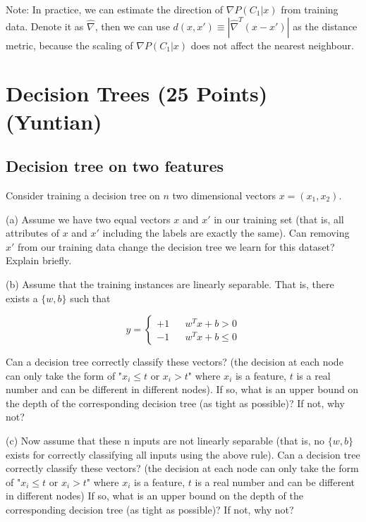 Note: In practice, we can estimate the direction of $\nabla P(C_1 |x)$ from training data. Denote it as $\hat{\nabla}$, then we can use $d(x, x') \equiv |\hat{\nabla}^T (x - x')|$ as the distance metric, because the scaling of $\nabla P(C_1 |x)$ does not affect the nearest neighbour.

\section{Decision Trees (25 Points) (Yuntian)}
\subsection{Decision tree on two features}
Consider training a decision tree on $n$ two dimensional vectors $x = (x_1,x_2)$.

(a) Assume we have two equal vectors $x$ and $x'$ in our training set (that is, all attributes of $x$ and $x'$ including the labels are exactly the same). Can removing $x'$ from our training data change the decision tree we learn for this dataset? Explain briefly.

(b) Assume that the training instances are linearly separable. That is, there exists a $\{w, b\}$ such that

$$
y=\left\{
\begin{array}{rcl}
+1       &      & {w^T x + b > 0}\\
-1     &      & {w^T x + b \le 0}
\end{array} \right.
$$

Can a decision tree correctly classify these vectors? ({\color{red}the decision at each node can only take the form of "$x_i \le t$ or $x_i > t$" where $x_i$ is a feature, $t$ is a real number and can be different in different nodes}). If so, what is an upper bound on the depth of the corresponding decision tree (as tight as possible)? If not, why not?

(c) Now assume that these n inputs are not linearly separable (that is, no $\{w, b\}$ exists for correctly classifying all inputs using the above rule). Can a decision tree correctly classify these vectors? ({\color{red}the decision at each node can only take the form of "$x_i \le t$ or $x_i > t$" where $x_i$ is a feature, $t$ is a real number and can be different in different nodes}) If so, what is an upper bound on the depth of the corresponding decision tree (as tight as possible)? If not, why not?

